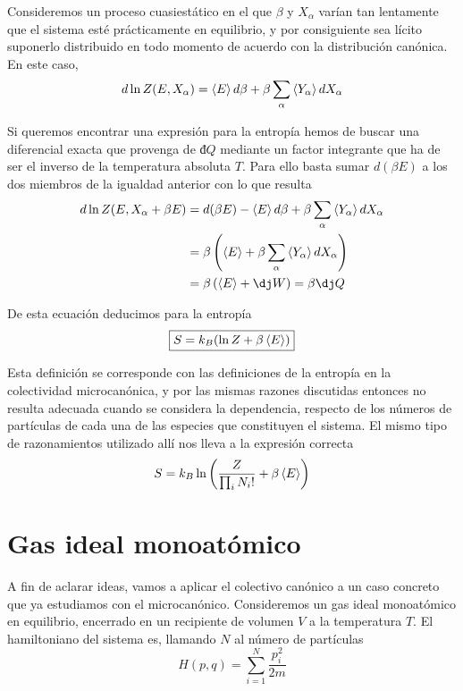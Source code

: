 Consideremos un proceso cuasiestático en el que $\beta$ y $X_\alpha$ varían tan lentamente que el sistema esté prácticamente en equilibrio, y por consiguiente sea lícito suponerlo distribuido en todo momento de acuerdo con la distribución canónica. En este caso,
\begin{equation}
	d\ln Z(E,X_\alpha) = \expval{E} d\beta + \beta \sum_{\alpha} \left\langle Y_\alpha \right\rangle  dX_\alpha
\end{equation}

Si queremos encontrar una expresión para la entropía hemos de buscar una diferencial exacta que provenga de $đQ$ mediante un factor integrante que ha de ser el inverso de la temperatura absoluta $T$. Para ello basta sumar $d(\beta E)$ a los dos miembros de la igualdad anterior con lo que resulta
\begin{align}
	d\ln Z(E,X_\alpha + \beta E) &= d(\beta E) - \expval{E} d\beta + \beta \sum_{\alpha} \left\langle Y_\alpha \right\rangle  dX_\alpha \nonumber \\
					 			 &=\beta \left(  \expval{E} + \beta \sum_{\alpha} \left\langle Y_\alpha \right\rangle  dX_\alpha \right)  \\
					 			 &=\beta \left( \expval{E} + đW \right) = \beta đQ \nonumber
\end{align}

De esta ecuación deducimos para la entropía
\begin{equation}
	\boxed{S = k_B (\ln Z  + \beta \expval{E})}
\end{equation}

Esta definición se corresponde con las definiciones de la entropía en la colectividad microcanónica, y por las mismas razones discutidas entonces no resulta adecuada cuando se considera la dependencia, respecto de los números de partículas de cada una de las especies que constituyen el sistema.
El mismo tipo de razonamientos utilizado allí nos lleva a la expresión correcta
\begin{equation}
	S = k_B \ln \left( \frac{Z}{\prod_i N_i!}  + \beta \expval{E} \right)
\end{equation}

\section{Gas ideal monoatómico}

A fin de aclarar ideas, vamos a aplicar el colectivo canónico a un caso concreto que ya estudiamos con el microcanónico.
Consideremos un gas ideal monoatómico en equilibrio, encerrado en un recipiente de volumen $V$ a la temperatura $T$.
El hamiltoniano del sistema es, llamando $N$ al número de partículas
$$H(p,q) = \sum_{i=1}^N \frac{p_i^2}{2m}$$

